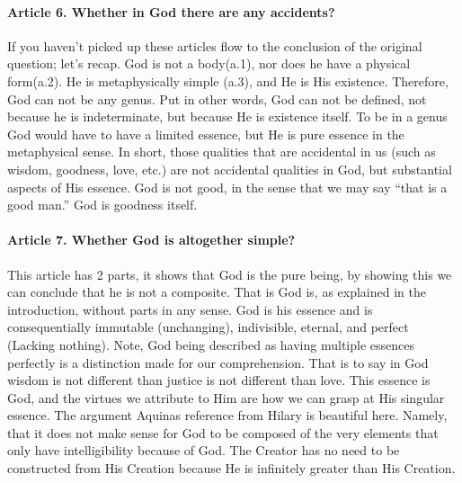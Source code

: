\documentclass{ucetd}
\begin{document}
\paragraph{Article 6. Whether in God there are any accidents?}
If you haven't picked up these articles flow to the conclusion of the original question; let's recap.
God is not a body(a.1), nor does he have a physical form(a.2). He is metaphysically simple (a.3), and He is His existence. Therefore, God can not be any genus. Put in other words, God can not be defined, not because he is indeterminate, but because He is existence itself. To be in a genus God would have to have a limited essence, but He is pure essence in the metaphysical sense. In short, those qualities that are accidental in us (such as wisdom, goodness, love, etc.) are not accidental qualities in God, but substantial aspects of His essence. God is not good, in the sense that we may say ``that is a good man.'' God is goodness itself.

\paragraph{Article 7. Whether God is altogether simple?}
This article has 2 parts, it shows that God is the pure being, by showing this we can conclude that he is not a composite. That is God is, as explained in the introduction, without parts in any sense. God is his essence and is consequentially immutable (unchanging), indivisible, eternal, and perfect (Lacking nothing). Note, God being described as having multiple essences perfectly is a distinction made for our comprehension. That is to say in God wisdom is not different than justice is not different than love. This essence is God, and the virtues we attribute to Him are how we can grasp at His singular essence. The argument Aquinas reference from Hilary is beautiful here. Namely, that it does not make sense for God to be composed of the very elements that only have intelligibility because of God. The Creator has no need to be constructed from His Creation because He is infinitely greater than His Creation.
\end{document}
